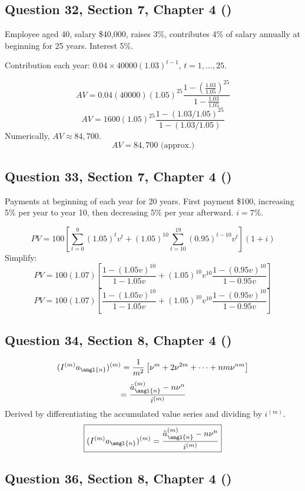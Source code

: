 \documentclass[12pt, a4paper]{article}
\begin{document}
\subsection*{Question 32, Section 7, Chapter 4  (\cite{toi3rd})}

Employee aged 40, salary \$40,000, raises 3\%, contributes 4\% of salary annually at beginning for 25 years.  
Interest 5\%.

Contribution each year: \( 0.04 \times 40000 (1.03)^{t-1} \), \(t=1,\dots,25\).

\[
AV = 0.04(40000)(1.05)^{25} \frac{1 - \left(\frac{1.03}{1.05}\right)^{25}}{1 - \frac{1.03}{1.05}}
\]
\[
\boxed{AV = 1600(1.05)^{25} \frac{1 - (1.03/1.05)^{25}}{1 - (1.03/1.05)}}
\]
Numerically, \( AV \approx 84{,}700 \).
\[
\boxed{AV = 84{,}700 \text{ (approx.)}}
\]

\subsection*{Question 33, Section 7, Chapter 4  (\cite{toi3rd})}

Payments at beginning of each year for 20 years.  
First payment \$100, increasing 5\% per year to year 10, then decreasing 5\% per year afterward.  
\(i = 7\%\).

\[
PV = 100 \left[\sum_{t=0}^{9} (1.05)^t v^t + (1.05)^{10} \sum_{t=10}^{19} (0.95)^{t-10} v^t \right] (1+i)
\]
Simplify:
\[
PV = 100(1.07)\left[\frac{1 - (1.05v)^{10}}{1 - 1.05v} + (1.05)^{10} v^{10} \frac{1 - (0.95v)^{10}}{1 - 0.95v}\right]
\]
\[
\boxed{PV = 100(1.07)\left[\frac{1 - (1.05v)^{10}}{1 - 1.05v} + (1.05)^{10} v^{10} \frac{1 - (0.95v)^{10}}{1 - 0.95v}\right]}
\]

\subsection*{Question 34, Section 8, Chapter 4  (\cite{toi3rd})}

\[
(I^{(m)} a_{\angl{n}})^{(m)} = \frac{1}{m^2}\left[\nu^m + 2\nu^{2m} + \cdots + n m \nu^{n m}\right]
\]
\[
= \frac{\ddot{a}_{\angl{n}}^{(m)} - n\nu^n}{i^{(m)}}
\]
Derived by differentiating the accumulated value series and dividing by \(i^{(m)}\).
\[
\boxed{(I^{(m)} a_{\angl{n}})^{(m)} = \frac{\ddot{a}_{\angl{n}}^{(m)} - n\nu^n}{i^{(m)}}}
\]

\subsection*{Question 36, Section 8, Chapter 4  (\cite{toi3rd})}
\end{document}
